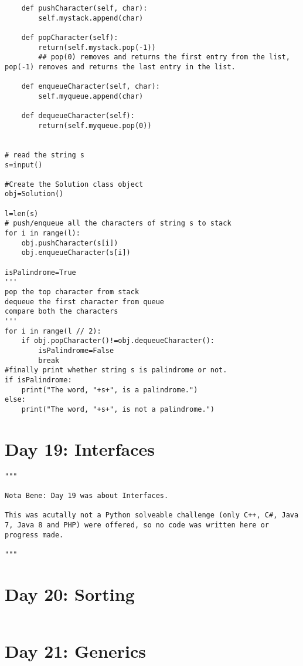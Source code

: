 \documentclass[11pt,a4paper]{article}
\begin{document}
\begin{lstlisting}
    def pushCharacter(self, char):
        self.mystack.append(char)

    def popCharacter(self):
        return(self.mystack.pop(-1))
        ## pop(0) removes and returns the first entry from the list, pop(-1) removes and returns the last entry in the list.

    def enqueueCharacter(self, char):
        self.myqueue.append(char)

    def dequeueCharacter(self):
        return(self.myqueue.pop(0))

    
# read the string s
s=input()

#Create the Solution class object
obj=Solution()   

l=len(s)
# push/enqueue all the characters of string s to stack
for i in range(l):
    obj.pushCharacter(s[i])
    obj.enqueueCharacter(s[i])
    
isPalindrome=True
'''
pop the top character from stack
dequeue the first character from queue
compare both the characters
''' 
for i in range(l // 2):
    if obj.popCharacter()!=obj.dequeueCharacter():
        isPalindrome=False
        break
#finally print whether string s is palindrome or not.
if isPalindrome:
    print("The word, "+s+", is a palindrome.")
else:
    print("The word, "+s+", is not a palindrome.") 
\end{lstlisting}


\newpage
\section{Day 19: Interfaces}
\begin{lstlisting}
"""

Nota Bene: Day 19 was about Interfaces.

This was acutally not a Python solveable challenge (only C++, C#, Java 7, Java 8 and PHP) were offered, so no code was written here or progress made. 

"""
\end{lstlisting}


\newpage
\section{Day 20: Sorting}
\begin{lstlisting}
\end{lstlisting}

\newpage
\section{Day 21: Generics}
\begin{lstlisting}
\end{lstlisting}
\end{document}
